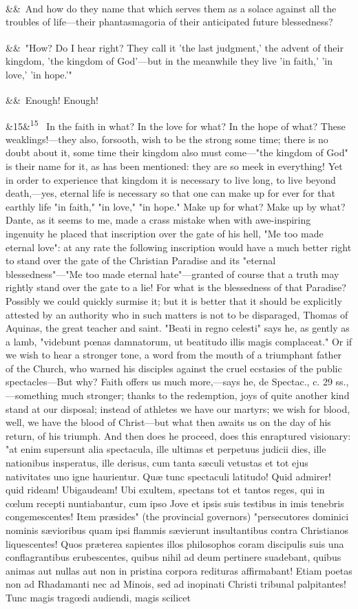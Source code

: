 \documentclass[12pt]{article}
\newcommand{\para}[1][]{\par\noindent\ifx&#1&\else\textsuperscript{\footnotesize #1}~\fi}
\begin{document}
\para And how do they name that which serves them as a solace against all the troubles of life---their phantasmagoria of their anticipated future blessedness?

\para "How? Do I hear right? They call it 'the last judgment,' the advent of their kingdom, 'the kingdom of God'---but in the meanwhile they live 'in faith,' 'in love,' 'in hope.'"

\para Enough! Enough!

\para[15] In the faith in what? In the love for what? In the hope of what? These weaklings!---they also, forsooth, wish to be the strong some time; there is no doubt about it, some time their kingdom also must come---"the kingdom of God" is their name for it, as has been mentioned: they are so meek in everything! Yet in order to experience that kingdom it is necessary to live long, to live beyond death,---yes, eternal life is necessary so that one can make up for ever for that earthly life "in faith," "in love," "in hope." Make up for what? Make up by what? Dante, as it seems to me, made a crass mistake when with awe-inspiring ingenuity he placed that inscription over the gate of his hell, "Me too made eternal love": at any rate the following inscription would have a much better right to stand over the gate of the Christian Paradise and its "eternal blessedness"---"Me too made eternal hate"---granted of course that a truth may rightly stand over the gate to a lie! For what is the blessedness of that Paradise? Possibly we could quickly surmise it; but it is better that it should be explicitly attested by an authority who in such matters is not to be disparaged, Thomas of Aquinas, the great teacher and saint. "Beati in regno celesti" says he, as gently as a lamb, "videbunt pœnas damnatorum, ut beatitudo illis magis complaceat." Or if we wish to hear a stronger tone, a word from the mouth of a triumphant father of the Church, who warned his disciples against the cruel ecstasies of the public spectacles---But why? Faith offers us much more,---says he, de Spectac., c. 29 ss.,---something much stronger; thanks to the redemption, joys of quite another kind stand at our disposal; instead of athletes we have our martyrs; we wish for blood, well, we have the blood of Christ---but what then awaits us on the day of his return, of his triumph. And then does he proceed, does this enraptured visionary: "at enim supersunt alia spectacula, ille ultimas et perpetuus judicii dies, ille nationibus insperatus, ille derisus, cum tanta sæculi vetustas et tot ejus nativitates uno igne haurientur. Quæ tunc spectaculi latitudo! Quid admirer! quid rideam! Ubigaudeam! Ubi exultem, spectans tot et tantos reges, qui in cœlum recepti nuntiabantur, cum ipso Jove et ipsis suis testibus in imis tenebris congemescentes! Item præsides" (the provincial governors) "persecutores dominici nominis sævioribus quam ipsi flammis sævierunt insultantibus contra Christianos liquescentes! Quos præterea sapientes illos philosophos coram discipulis suis una conflagrantibus erubescentes, quibus nihil ad deum pertinere suadebant, quibus animas aut nullas aut non in pristina corpora redituras affirmabant! Etiam poetas non ad Rhadamanti nec ad Minois, sed ad inopinati Christi tribunal palpitantes! Tunc magis tragœdi audiendi, magis scilicet 
\end{document}
